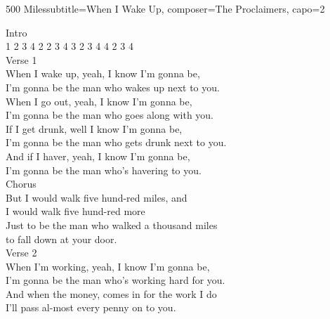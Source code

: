 \begin{song}{500 Miles}{subtitle={When I Wake Up}, composer={The Proclaimers}, capo={2}}

Intro \\
 1 2 3 4     2 2 3 4     3 2 3 4     4 2 3 4 \\

Verse 1 \\
When I wake up, yeah, I know I'm gonna be, \\
I'm gonna be the man who wakes up next to you. \\

When I go out, yeah, I know I'm gonna be, \\
I'm gonna be the man who goes along with you. \\

If I get drunk, well I know I'm gonna be, \\
I'm gonna be the man who gets drunk next to you. \\

And if I haver, yeah, I know I'm gonna be, \\
I'm gonna be the man who's havering to you. \\

Chorus \\
But I would walk  five hund-red miles, and \\
I    would     walk    five hund-red    more \\
Just to be the man who walked a thousand miles \\
to fall down at your door.     \\

Verse 2 \\
When I'm working, yeah, I know I'm gonna be, \\
I'm gonna be the man who's working hard for you. \\

And when the money,    comes in for the work I do \\
I'll pass al-most every penny on to you. \\


\end{song}
